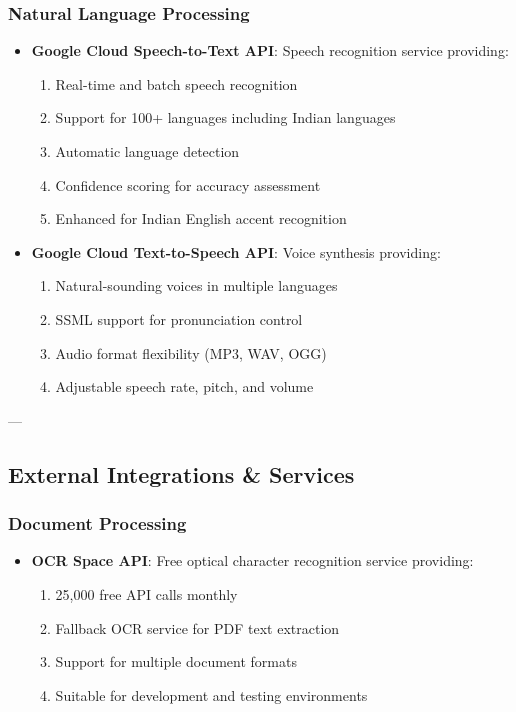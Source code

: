 \subsubsection{Natural Language Processing}
\begin{itemize}
    \item \textbf{Google Cloud Speech-to-Text API}: Speech recognition service providing:
    \begin{enumerate}
        \item Real-time and batch speech recognition
        \item Support for 100+ languages including Indian languages
        \item Automatic language detection
        \item Confidence scoring for accuracy assessment
        \item Enhanced for Indian English accent recognition
    \end{enumerate}
    \item \textbf{Google Cloud Text-to-Speech API}: Voice synthesis providing:
    \begin{enumerate}
        \item Natural-sounding voices in multiple languages
        \item SSML support for pronunciation control
        \item Audio format flexibility (MP3, WAV, OGG)
        \item Adjustable speech rate, pitch, and volume
    \end{enumerate}
\end{itemize}

---

\subsection{External Integrations \& Services}

\subsubsection{Document Processing}
\begin{itemize}
    \item \textbf{OCR Space API}: Free optical character recognition service providing:
    \begin{enumerate}
        \item 25,000 free API calls monthly
        \item Fallback OCR service for PDF text extraction
        \item Support for multiple document formats
        \item Suitable for development and testing environments
    \end{enumerate}
\end{itemize}

